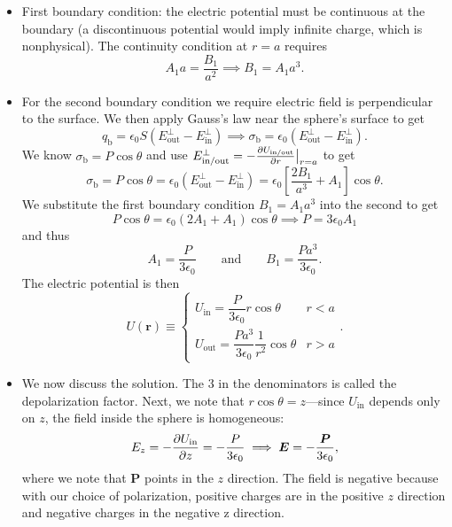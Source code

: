 \documentclass[11pt, a4paper]{article}
\newcommand{\eqtext}[1]{\qquad \text{#1} \qquad}
\renewcommand{\vec}[1]{\bm{#1}} %
\renewcommand{\r}{\vec{r}}
\newcommand{\E}{\vec{E}}  %
\newcommand{\ee}{\epsilon_{0}}  %
\renewcommand{\P}{\vec{P}}  %
\begin{document}
\begin{itemize}
	\item First boundary condition: the electric potential must be continuous at the boundary (a discontinuous potential would imply infinite charge, which is nonphysical). The continuity condition at $ r = a $ requires
	\begin{equation*}
		A_{1}a = \frac{B_{1}}{a^{2}} \implies B_{1} = A_{1}a^{3}.
	\end{equation*}
	
	\item For the second boundary condition we require electric field is perpendicular to the surface. We then apply Gauss's law near the sphere's surface to get
	\begin{equation*}
		q_{\text{b}} = \ee S (E_{\text{out}}^{\perp} - E_{\text{in}}^{\perp})  \implies \sigma_{\text{b}} = \ee (E_{\text{out}}^{\perp} - E_{\text{in}}^{\perp}).
	\end{equation*}
	We know $ \sigma_{\text{b}} = P \cos \theta $ and use $ E_{\text{in/out}}^{\perp} = - \pdv{U_{\text{in/out}}}{r}\big |_{r = a} $ to get
	\begin{equation*}
		\sigma_{\text{b}} = P\cos \theta = \ee (E_{\text{out}}^{\perp} - E_{\text{in}}^{\perp}) = \ee \left[  \frac{2B_{1}}{a^{3}} + A_{1}\right]\cos \theta.
	\end{equation*}
	We substitute the first boundary condition $ B_{1} = A_{1}a^{3} $ into the second to get
	\begin{equation*}
		P \cos \theta = \ee \left(2A_{1} + A_{1}\right)\cos \theta \implies P = 3 \ee A_{1} 
	\end{equation*}
	and thus
	\begin{equation*}
		A_{1} = \frac{P}{3\ee} \eqtext{and} B_{1} = \frac{Pa^{3}}{3\ee}.
	\end{equation*}
	The electric potential is then
	\begin{equation*}
		U(\r) \equiv 
		\begin{cases}
			U_{\text{in}} = \dfrac{P}{3\ee} r \cos \theta & r < a\\[3mm]
			U_{\text{out}} = \dfrac{Pa^{3}}{3\ee}\dfrac{1}{r^{2}}\cos \theta & r > a
		\end{cases}.
	\end{equation*}
	
	\item We now discuss the solution. The 3 in the denominators is called the depolarization factor. Next, we note that $ r \cos \theta = z $---since $ U_{\text{in}} $ depends only on $ z $, the field inside the sphere is homogeneous:
	\begin{equation*}
		E_{z} = - \pdv{U_{\text{in}}}{z} = -\frac{P}{3\ee} \implies \E = - \frac{\P}{3\ee},
	\end{equation*}
	where we note that $ \P $ points in the $ z $ direction. The field is negative because with our choice of polarization, positive charges are in the positive $ z $ direction and negative charges in the negative z direction. 
	

\end{itemize}
\end{document}
